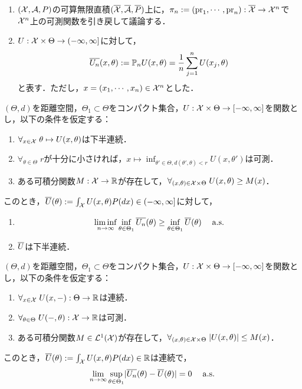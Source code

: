 \documentclass[uplatex,dvipdfmx]{jsreport}
\begin{document}
\begin{notation}\mbox{}
    \begin{enumerate}
        \item $(\mathcal{X},\mathcal{A},P)$の可算無限直積$(\overline{\mathcal{X}},\overline{\mathcal{A}},\overline{P})$上に，$\pi_n:=(\mathrm{pr}_1,\cdots,\mathrm{pr}_n):\overline{\mathcal{X}}\to\mathcal{X}^n$で$\mathcal{X}^n$上の可測関数を引き戻して議論する．
        \item $U:\mathcal{X}\times\Theta\to(-\infty,\infty]$に対して，
        \[\overline{U_n}(x,\theta):=\mathbb{P}_nU(x,\theta)=\frac{1}{n}\sum^n_{j=1}U(x_j,\theta)\]
        と表す．ただし，$x=(x_1,\cdots,x_n)\in\mathcal{X}^n$とした．
    \end{enumerate}
\end{notation}

\begin{lemma}
    $(\Theta,d)$を距離空間，$\Theta_1\subset\Theta$をコンパクト集合，$U:\mathcal{X}\times\Theta\to[-\infty,\infty]$を関数とし，以下の条件を仮定する：
    \begin{enumerate}[({A}1)]
        \item $\forall_{x\in\mathcal{X}}\;\theta\mapsto U(x,\theta)$は下半連続．
        \item $\forall_{\theta\in\Theta}\;r$が十分に小さければ，$x\mapsto\inf_{\theta'\in\Theta,d(\theta',\theta)<r}U(x,\theta')$は可測．
        \item ある可積分関数$M:\mathcal{X}\to\mathbb{R}$が存在して，$\forall_{(x,\theta)\in\mathcal{X}\times\Theta}\;U(x,\theta)\ge M(x)$．
    \end{enumerate}
    このとき，$\overline{U}(\theta):=\int_{\mathcal{X}} U(x,\theta)P(dx)\in(-\infty,\infty]$に対して，
    \begin{enumerate}
        \item 
        \[\liminf_{n\to\infty}\inf_{\theta\in\Theta_1}\overline{U_n}(\theta)\ge\inf_{\theta\in\Theta_1}\overline{U}(\theta)\quad\;\mathrm{a.s.}\]
        \item $\overline{U}$は下半連続．
    \end{enumerate}
\end{lemma}

\begin{theorem}[一様大数の法則]
    $(\Theta,d)$を距離空間，$\Theta_1\subset\Theta$をコンパクト集合，$U:\mathcal{X}\times\Theta\to[-\infty,\infty]$を関数とし，以下の条件を仮定する：
    \begin{enumerate}[({A}1)]
        \item $\forall_{x\in\mathcal{X}}\;U(x,-):\Theta\to\mathbb{R}$は連続．
        \item $\forall_{\theta\in\Theta}\;U(-,\theta):\mathcal{X}\to\mathbb{R}$は可測．
        \item ある可積分関数$M\in\mathcal{L}^1(\mathcal{X})$が存在して，$\forall_{(x,\theta)\in\mathcal{X}\times\Theta}\;\lvert U(x,\theta)\rvert\le M(x)$．
    \end{enumerate}
    このとき，$\overline{U}(\theta):=\int_{\mathcal{X}} U(x,\theta)P(dx)\in\mathbb{R}$は連続で，
    \[\lim_{n\to\infty}\sup_{\theta\in\Theta_1}\lvert\overline{U_n}(\theta)-\overline{U}(\theta)\rvert=0\quad\;\mathrm{a.s.}\]
\end{theorem}
\end{document}
